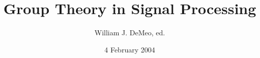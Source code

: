 \begin{titlepage}
\author{William J. DeMeo, ed.}
\title{Group Theory in Signal Processing}
\date{4 February 2004}
\end{titlepage}